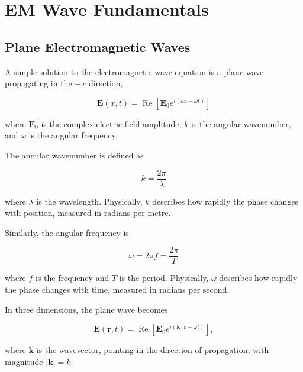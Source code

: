 
\section{EM Wave Fundamentals}
\label{sec:Em:em_wave_fundementals}

\subsection{Plane Electromagnetic Waves}

A simple solution to the electromagnetic wave equation
is a plane wave propagating in the $+x$ direction,

\begin{equation}
\boxed{
\mathbf{E}(x,t) =
\operatorname{Re}\left[
\mathbf{E}_0 e^{i(kx-\omega t)}
\right]
}
\label{eq:em_plane_wave}
\end{equation}

where $\mathbf{E}_0$ is the complex electric field
amplitude, $k$ is the angular wavenumber, and
$\omega$ is the angular frequency.

The angular wavenumber is defined as

\begin{equation}
\boxed{k = \frac{2\pi}{\lambda}}
\label{eq:angular_wavenumber}
\end{equation}

where $\lambda$ is the wavelength. Physically, $k$
describes how rapidly the phase changes with
position, measured in radians per metre.

Similarly, the angular frequency is

\begin{equation}
\boxed{\omega = 2\pi f = \frac{2\pi}{T}}
\label{eq:angular_frequency}
\end{equation}

where $f$ is the frequency and $T$ is the period.
Physically, $\omega$ describes how rapidly the
phase changes with time, measured in radians
per second.

In three dimensions, the plane wave becomes

\begin{equation}
\mathbf{E}(\mathbf{r},t) =
\operatorname{Re}\left[
\mathbf{E}_0
e^{i(\mathbf{k}\cdot\mathbf{r}-\omega t)}
\right],
\label{eq:em_plane_wave_3d}
\end{equation}

where $\mathbf{k}$ is the wavevector, pointing
in the direction of propagation, with
magnitude $|\mathbf{k}|=k$.


